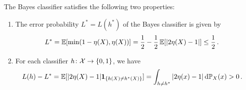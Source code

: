 \begin{theorem}
\label{thm: bayes classifier}
The Bayes classifier satisfies the following two properties:
\begin{enumerate}
    \item The error probability $L^* = L(h^*)$ of the Bayes classifier is given by
    \begin{equation}
        \label{eq: bayes error}
        L^* = \operatorname{\mathbb{E}}[\min(1 - \eta(X), \eta(X))] = \frac{1}{2} - \frac{1}{2} \operatorname{\mathbb{E}}[\abs{2\eta(X) - 1}] \leq \frac{1}{2} \, .
    \end{equation}

    \item For each classifier $h \colon \mathcal{X} \to \set{0, 1}$, we have
    \begin{equation}
        \label{eq: excess risk}
        L(h) - L^* = \Exp[\abs{2\eta(X) - 1} \indSet{h(X) \neq h^*(X)}] = \int_{h \neq h^*} \abs{2\eta(x) - 1} \dP_X(x) > 0 \, .
    \end{equation}
\end{enumerate}
\end{theorem}

